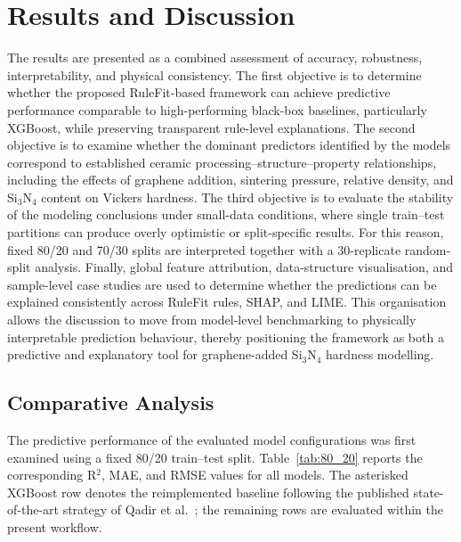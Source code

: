 \documentclass[pdflatex,sn-mathphys-num]{sn-jnl}%
\newif\ifrevmarks%
\newcommand{\revmark}[1]{\ifrevmarks\textcolor{revblue}{#1}\else#1\fi}%
\theoremstyle{thmstyleone}%
\theoremstyle{thmstyletwo}%
\theoremstyle{thmstylethree}%
\begin{document}
\section{Results and Discussion}
\revmark{The results are presented as a combined assessment of accuracy, robustness, interpretability, and physical consistency. The first objective is to determine whether the proposed RuleFit-based framework can achieve predictive performance comparable to high-performing black-box baselines, particularly XGBoost, while preserving transparent rule-level explanations. The second objective is to examine whether the dominant predictors identified by the models correspond to established ceramic processing--structure--property relationships, including the effects of graphene addition, sintering pressure, relative density, and Si$_3$N$_4$ content on Vickers hardness. The third objective is to evaluate the stability of the modeling conclusions under small-data conditions, where single train--test partitions can produce overly optimistic or split-specific results. For this reason, fixed 80/20 and 70/30 splits are interpreted together with a 30-replicate random-split analysis. Finally, global feature attribution, data-structure visualisation, and sample-level case studies are used to determine whether the predictions can be explained consistently across RuleFit rules, SHAP, and LIME. This organisation allows the discussion to move from model-level benchmarking to physically interpretable prediction behaviour, thereby positioning the framework as both a predictive and explanatory tool for graphene-added Si$_3$N$_4$ hardness modelling.}


\subsection{Comparative Analysis}
\label{sec:comparative}

The predictive performance of the evaluated model configurations was first examined using a fixed 80/20 train--test split. Table~\ref{tab:80_20} reports the corresponding R$^2$, MAE, and RMSE values for all models. The asterisked XGBoost row denotes the reimplemented baseline following the published state-of-the-art strategy of Qadir et al.~\cite{qadir2024predicting}; the remaining rows are evaluated within the present workflow.

\end{document}
